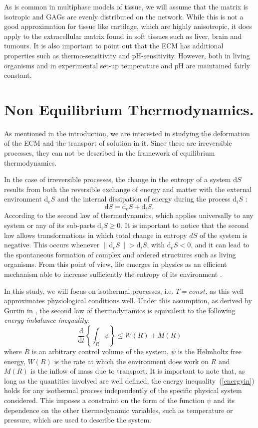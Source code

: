 \documentclass[runningheads]{llncs}
\renewcommand{\d}{\ensuremath{\text{d}}}
\begin{document}
As is common in multiphase models of tissue, we will assume that the matrix is isotropic and GAGs are evenly distributed on the network. While this is not a good approximation for tissue like cartilage, which are highly anisotropic, it does apply to the extracellular matrix found in soft tissues such as liver, brain and tumours. It is also important to point out that the ECM has additional properties such as thermo-sensitivity and pH-sensitivity. However, both in living organisms and in experimental set-up temperature and pH are maintained fairly constant.

\section{Non Equilibrium Thermodynamics.}
\label{secNET}
As mentioned in the introduction, we are interested in studying the deformation of the ECM and the transport of solution in it. Since these are irreversible processes, they can not be described in the framework of equilibrium thermodynamics. 

In the case of irreversible processes, the change in the entropy of a system $\d S$ results from both the reversible exchange of energy and matter with the external environment $\d_eS$ and the internal dissipation of energy during the process $\d_iS$ \cite{NET}:
\begin{equation}
\d S = \d_eS + \d_iS, 
\end{equation}
According to the second law of thermodynamics, which applies universally to any system or any of its sub-parts $\d_i S\ge 0$. It is important to notice that the second law allows transformations in which total change in entropy $d S$ of the system is negative. This occurs whenever $\|\d_e S\|>\d_i S$, with $\d_e S <0$, and it can lead to the spontaneous formation of complex and ordered structures such as living organisms. From this point of view, life emerges in physics as an efficient mechanism able to increase sufficiently the entropy of its environment \cite{JeremyEngland}.  

In this study, we will focus on isothermal processes, i.e. $T=const$, as this well approximates physiological conditions well. Under this assumption, as derived by Gurtin in \cite{GURTIN}, the second law of thermodynamics is equivalent to the following \textit{energy imbalance inequality}:
\begin{equation}
\frac{\d}{\d t} \left\{\int_R \psi \right\}\leq W(R) + M(R) \label{energyin}
\end{equation}
where $R$ is an arbitrary control volume of the system, $\psi$ is the Helmholtz free energy, $W(R)$ is the rate at which the environment does work on $R$ and $M(R)$ is the inflow of mass due to transport. It is important to note that, as long as the quantities involved are well defined, the energy inequality~(\ref{energyin}) holds for any isothermal process independently of the specific physical system considered. This imposes a constraint on the form of the function $\psi$ and its dependence on the other thermodynamic variables, such as temperature or pressure, which are used to describe the system. 
\end{document}
